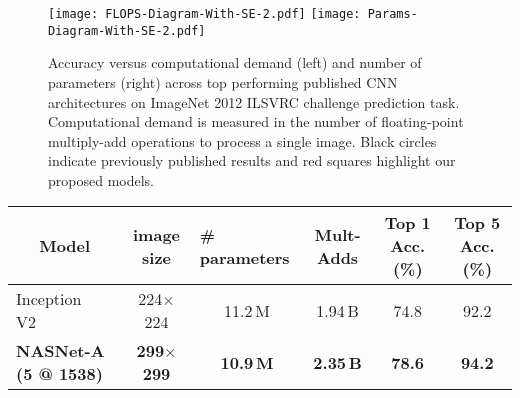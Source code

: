\documentclass[10pt,twocolumn,letterpaper]{article}
\begin{document}
\begin{figure*}[h!]
\begin{center}
\texttt{[image: FLOPS-Diagram-With-SE-2.pdf]}
\hfill
\texttt{[image: Params-Diagram-With-SE-2.pdf]}
\caption{Accuracy versus computational demand (left) and number of parameters (right) across top performing published CNN architectures on ImageNet 2012 ILSVRC challenge prediction task. Computational demand is measured in the number of floating-point multiply-add operations to process a single image. Black circles indicate previously published results and red squares highlight our proposed models.}
\label{figure:flops_vs_accuracy}
\end{center}
\end{figure*}\begin{table*}[h!]
\centering
\small
\begin{tabular}{lc|cc|cc}
\toprule
\multicolumn{1}{c}{\bf Model} & {\bf image size} & \multicolumn{1}{l}{\bf \# parameters} & \bf Mult-Adds & \bf Top 1 Acc. (\%) & \bf Top 5 Acc. (\%) \\ \midrule
Inception V2~\cite{BatchNorm} & 224$\times$224 & 11.2\,M & 1.94\,B & 74.8 & 92.2 \\
\textbf{NASNet-A (5 @ 1538)} & \textbf{299$\times$299} & \textbf{10.9\,M} & \textbf{2.35\,B} & \textbf{78.6} & \textbf{94.2} \\

\end{tabular}
\end{table*}
\end{document}

